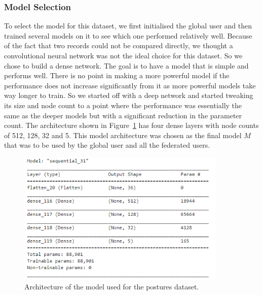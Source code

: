 \documentclass[12pt]{article}
\newcommand{\forcond}[2]{#1 \KwTo #2}
\begin{document}
%	    
\subsubsection{Model Selection}
To select the model for this dataset, we first initialised the global user and then trained several models on it to see which one performed relatively well. Because of the fact that two records could not be compared directly, we thought a convolutional neural network was not the ideal choice for this dataset. So we chose to build a dense network. The goal is to have a model that is simple and performs well. There is no point in making a more powerful model if the performance does not increase significantly from it as more powerful models take way longer to train. So we started off with a deep network and started tweaking its size and node count to a point where the performance was essentially the same as the deeper models but with a significant reduction in the parameter count. The architecture shown in Figure~\ref{fig:posture_model} has four dense layers with node counts of 512, 128, 32 and 5. This model architecture was chosen as the final model $M$ that was to be used by the global user and all the federated users. 
\begin{figure}[H]
	\centering
	\includegraphics[width=10cm]{resources/posture_model.png}
	\caption{Architecture of the model used for the postures dataset.}
	\label{fig:posture_model}
\end{figure}
\end{document}
